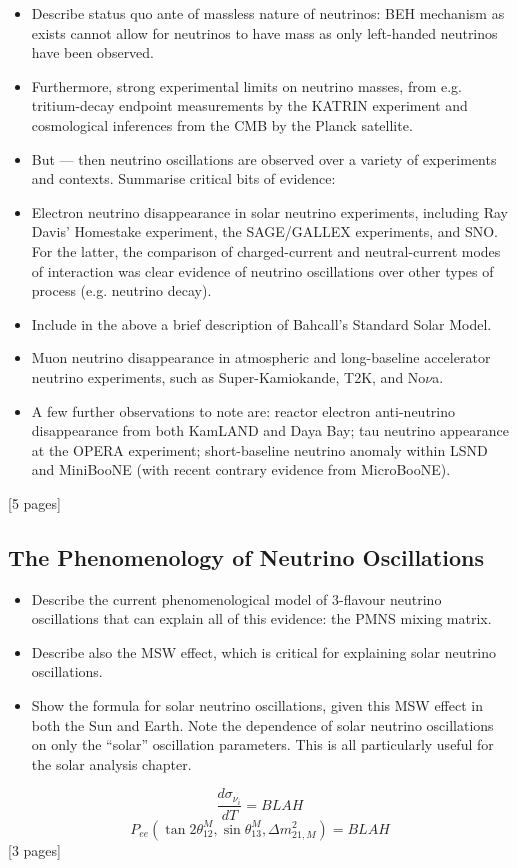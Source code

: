 {
\color{blue}
\begin{itemize}
    \item Describe status quo ante of massless nature of neutrinos: BEH mechanism as exists cannot allow for neutrinos to have mass as only left-handed neutrinos have been observed.
    \item Furthermore, strong experimental limits on neutrino masses, from e.g. tritium-decay endpoint measurements by the KATRIN experiment and cosmological inferences from the CMB by the Planck satellite.
    \item But --- then neutrino oscillations are observed over a variety of experiments and contexts. Summarise critical bits of evidence:
    \item Electron neutrino disappearance in solar neutrino experiments, including Ray Davis' Homestake experiment, the SAGE/GALLEX experiments, and SNO. For the latter, the comparison of charged-current and neutral-current modes of interaction was clear evidence of neutrino oscillations over other types of process (e.g. neutrino decay).
    \item Include in the above a brief description of Bahcall's Standard Solar Model.
    \item Muon neutrino disappearance in atmospheric and long-baseline accelerator neutrino experiments, such as Super-Kamiokande, T2K, and No$\nu$a.
    \item A few further observations to note are: reactor electron anti-neutrino disappearance from both KamLAND and Daya Bay; tau neutrino appearance at the OPERA experiment; short-baseline neutrino anomaly within LSND and MiniBooNE (with recent contrary evidence from MicroBooNE).
\end{itemize}
[5 pages]
\subsection{The Phenomenology of Neutrino Oscillations}\label{sec:nu_osc_phenom}
\begin{itemize}
    \item Describe the current phenomenological model of 3-flavour neutrino oscillations that can explain all of this evidence: the PMNS mixing matrix.
    \item Describe also the MSW effect, which is critical for explaining solar neutrino oscillations.
    \item Show the formula for solar neutrino oscillations, given this MSW effect in both the Sun and Earth. Note the dependence of solar neutrino oscillations on only the ``solar'' oscillation parameters. This is all particularly useful for the solar analysis chapter.
\end{itemize}
\begin{equation}\label{eq:enu_es_xsec}
    \frac{d\sigma_{\nu_{i}}}{dT} = BLAH
\end{equation}
\begin{equation}\label{eq:pee_msw}
    P_{ee}\left(\tan2\theta^{M}_{12}, \sin\theta^{M}_{13}, \Delta m^{2}_{21,M}\right) = BLAH
\end{equation}
[3 pages]
}

